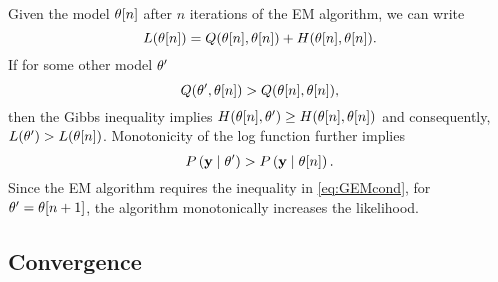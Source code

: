 Given the model ${\theta}{[n]}$ after $n$ iterations of the EM
algorithm, we can write
\begin{equation}
  L({\theta}{[n]}) = Q({\theta}{[n]}, {\theta}{[n]}) +
  H({\theta}{[n]}, {\theta}{[n]}).
\end{equation}
If for some other model $\theta'$
\begin{equation}
  \label{eq:GEMcond}
  Q(\theta',{\theta}{[n]}) >
  Q({\theta}{[n]},{\theta}{[n]}),
\end{equation}
then the Gibbs inequality implies $H({\theta}{[n]}, \theta') \geq H({\theta}{[n]},
{\theta}{[n]})$ and consequently, $L(\theta') >
L({\theta}{[n]})$.  Monotonicity of the log function further
implies
\begin{equation*}
  P \left(\mathbf{y} \mid \theta'\right) > P \left(\mathbf{y}\mid {\theta}{[n]} \right) .
\end{equation*}
Since the EM algorithm requires the inequality in \eqref{eq:GEMcond},
for $\theta' = {\theta}{[n+1]}$, the algorithm
monotonically increases the likelihood.

\subsection{Convergence}


